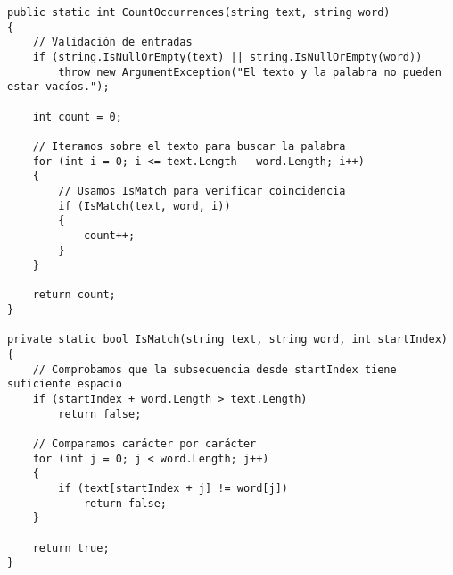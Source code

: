 \begin{lstlisting}
public static int CountOccurrences(string text, string word)
{
    // Validación de entradas
    if (string.IsNullOrEmpty(text) || string.IsNullOrEmpty(word))
        throw new ArgumentException("El texto y la palabra no pueden estar vacíos.");

    int count = 0;

    // Iteramos sobre el texto para buscar la palabra
    for (int i = 0; i <= text.Length - word.Length; i++)
    {
        // Usamos IsMatch para verificar coincidencia
        if (IsMatch(text, word, i))
        {
            count++;
        }
    }

    return count;
}

private static bool IsMatch(string text, string word, int startIndex)
{
    // Comprobamos que la subsecuencia desde startIndex tiene suficiente espacio
    if (startIndex + word.Length > text.Length)
        return false;

    // Comparamos carácter por carácter
    for (int j = 0; j < word.Length; j++)
    {
        if (text[startIndex + j] != word[j])
            return false;
    }

    return true;
}
\end{lstlisting}